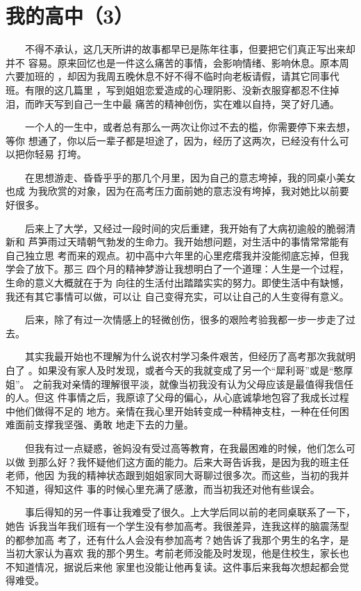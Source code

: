 \documentclass[12pt]{book}
\begin{document}
\section{我的高中（3）}
\label{sec-3-3}

　　不得不承认，这几天所讲的故事都早已是陈年往事，但要把它们真正写出来却并不
容易。原来回忆也是一件这么痛苦的事情，会影响情绪、影响休息。原本周六要加班的
，却因为我周五晚休息不好不得不临时向老板请假，请其它同事代班。有限的这几篇里
，写到姐姐恋爱造成的心理阴影、没新衣服穿都忍不住掉泪，而昨天写到自己一生中最
痛苦的精神创伤，实在难以自持，哭了好几通。

　　一个人的一生中，或者总有那么一两次让你过不去的槛，你需要停下来去想，等你
想通了，你以后一辈子都是坦途了，因为，经历了这两次，已经没有什么可以把你轻易
打垮。

　　在思想游走、昏昏乎乎的那几个月里，因为自己的意志垮掉，我的同桌小美女也成
为我欣赏的对象，因为在高考压力面前她的意志没有垮掉，我对她比以前要好很多。

　　后来上了大学，又经过一段时间的灾后重建，我开始有了大病初逾般的脆弱清新和
芦笋雨过天晴朝气勃发的生命力。我开始想问题，对生活中的事情常常能有自己独立思
考而来的观点。初中高中六年里的心里疙瘩我并没能彻底忘掉，但我学会了放下。那三
四个月的精神梦游让我想明白了一个道理：人生是一个过程，生命的意义大概就在于为
向往的生活付出踏踏实实的努力。即使生活中有缺憾，我还有其它事情可以做，可以让
自己变得充实，可以让自己的人生变得有意义。

　　后来，除了有过一次情感上的轻微创伤，很多的艰险考验我都一步一步走了过去。

　　其实我最开始也不理解为什么说农村学习条件艰苦，但经历了高考那次我就明白了
。如果没有家人及时发现，或者今天的我就变成了另一个“犀利哥”或是“憨厚姐”。
之前我对亲情的理解很平淡，就像当初我没有认为父母应该是最值得我信任的人。但这
件事情之后，我原谅了父母的偏心，从心底诚挚地包容了我成长过程中他们做得不足的
地方。亲情在我心里开始转变成一种精神支柱，一种在任何困难面前支撑我坚强、勇敢
地走下去的力量。

　　但我有过一点疑惑，爸妈没有受过高等教育，在我最困难的时候，他们怎么可以做
到那么好？我怀疑他们这方面的能力。后来大哥告诉我，是因为我的班主任老师，他因
为我的精神状态跟到姐姐家同大哥聊过很多次。而这些，当初的我并不知道，得知这件
事的时候心里充满了感激，而当初我还对他有些误会。

　　事后得知的另一件事让我难受了很久。上大学后同以前的老同桌联系了一下，她告
诉我当年我们班有一个学生没有参加高考。我很差异，连我这样的脑震荡型的都参加高
考了，还有什么人会没有参加高考？她告诉了我那个男生的名字，是当初大家认为喜欢
我的那个男生。考前老师没能及时发现，他是住校生，家长也不知道情况，据说后来他
家里也没能让他再复读。这件事后来我每次想起都会觉得难受。
\end{document}

